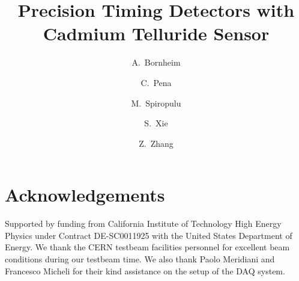 \documentclass[a4paper,11pt]{article}
\title{Precision Timing Detectors with Cadmium Telluride Sensor}
\author[1]{A.~Bornheim}
\author[1]{C.~Pena}
\author[1]{M.~Spiropulu}
\author[1]{S.~Xie}
\author[1]{Z.~Zhang}
\affiliation[1]{California Institute of Technology, Pasadena, CA, USA}
\begin{document}
  
\maketitle
\flushbottom
\linenumbers


%
%

%
%
  
%
%
  
%
%
  
%
%
  
%
%
  
%
%
  


\section{Acknowledgements} 
Supported by funding from California Institute of Technology High Energy Physics
under Contract DE-SC0011925 with the United States Department of Energy. We
thank the CERN testbeam facilities personnel for excellent beam conditions 
during our testbeam time. We also thank Paolo Meridiani and Francesco Micheli
for their kind assistance on the setup of the DAQ system.


%
%


{}
 




\end{document}
